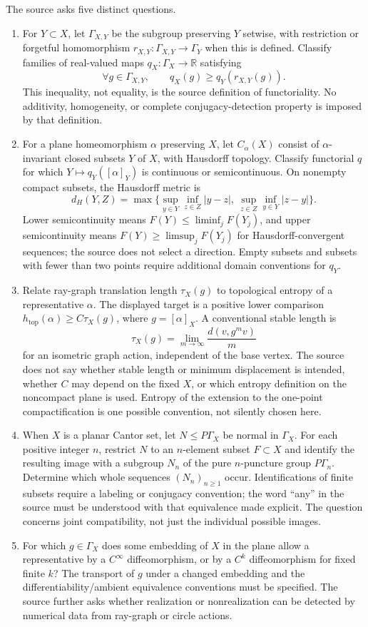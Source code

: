 \documentclass[11pt]{article}
\newcommand{\R}{\mathbb{R}}
\begin{document}
The source asks five distinct questions.
\begin{enumerate}
\item For $Y\subset X$, let $\Gamma_{X,Y}$ be the subgroup preserving $Y$ setwise, with restriction or forgetful homomorphism $r_{X,Y}:\Gamma_{X,Y}\to\Gamma_Y$ when this is defined. Classify families of real-valued maps $q_X:\Gamma_X\to\R$ satisfying
\[
\forall g\in\Gamma_{X,Y},\qquad q_X(g)\geq q_Y(r_{X,Y}(g)).
\]
This inequality, not equality, is the source definition of functoriality. No additivity, homogeneity, or complete conjugacy-detection property is imposed by that definition.
\item For a plane homeomorphism $\alpha$ preserving $X$, let $C_\alpha(X)$ consist of $\alpha$-invariant closed subsets $Y$ of $X$, with Hausdorff topology. Classify functorial $q$ for which $Y\mapsto q_Y([\alpha]_Y)$ is continuous or semicontinuous. On nonempty compact subsets, the Hausdorff metric is
\[
d_H(Y,Z)=\max\{\sup_{y\in Y}\inf_{z\in Z}|y-z|,\ \sup_{z\in Z}\inf_{y\in Y}|z-y|\}.
\]
Lower semicontinuity means $F(Y)\leq\liminf_jF(Y_j)$, and upper semicontinuity means $F(Y)\geq\limsup_jF(Y_j)$ for Hausdorff-convergent sequences; the source does not select a direction. Empty subsets and subsets with fewer than two points require additional domain conventions for $q_Y$.
\item Relate ray-graph translation length $\tau_X(g)$ to topological entropy of a representative $\alpha$. The displayed target is a positive lower comparison $h_{\mathrm{top}}(\alpha)\geq C\tau_X(g)$, where $g=[\alpha]_X$. A conventional stable length is
\[
\tau_X(g)=\lim_{m\to\infty}\frac{d(v,g^mv)}m
\]
for an isometric graph action, independent of the base vertex. The source does not say whether stable length or minimum displacement is intended, whether $C$ may depend on the fixed $X$, or which entropy definition on the noncompact plane is used. Entropy of the extension to the one-point compactification is one possible convention, not silently chosen here.
\item When $X$ is a planar Cantor set, let $N\leq P\Gamma_X$ be normal in $\Gamma_X$. For each positive integer $n$, restrict $N$ to an $n$-element subset $F\subset X$ and identify the resulting image with a subgroup $N_n$ of the pure $n$-puncture group $P\Gamma_n$. Determine which whole sequences $(N_n)_{n\geq1}$ occur. Identifications of finite subsets require a labeling or conjugacy convention; the word ``any'' in the source must be understood with that equivalence made explicit. The question concerns joint compatibility, not just the individual possible images.
\item For which $g\in\Gamma_X$ does some embedding of $X$ in the plane allow a representative by a $C^\infty$ diffeomorphism, or by a $C^k$ diffeomorphism for fixed finite $k$? The transport of $g$ under a changed embedding and the differentiability/ambient equivalence conventions must be specified. The source further asks whether realization or nonrealization can be detected by numerical data from ray-graph or circle actions.
\end{enumerate}
\end{document}
